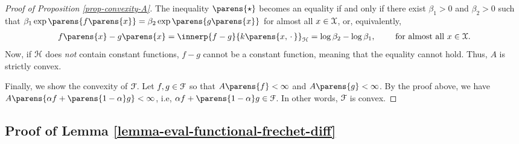 \begin{proof}[Proof of Proposition \ref{prop-convexity-A}]
	The inequality $\parens{\star}$ becomes an equality if and only if there exist $\beta_1 > 0$ and $\beta_2 > 0$ such that $\beta_1 \exp \parens{ f \parens{x} } = \beta_2 \exp \parens{g \parens{x}}$ for almost all $x \in \mathcal{X}$, or, equivalently, 
	\begin{align*}
		f \parens{x} - g \parens{x} = \innerp{f - g}{k \parens{x, \,\cdot\,}}_{\calH} = \log \beta_2 - \log \beta_1, \qquad \text{ for almost all } x \in \calX. 
	\end{align*}
	Now, if $\mathcal{H}$ does \emph{not} contain constant functions, $f - g$ cannot be a constant function, meaning that the equality cannot hold. Thus, $A$ is strictly convex. 
	
	
	Finally, we show the convexity of $\mathcal{F}$. Let $f, g \in \mathcal{F}$ so that $A \parens{f} < \infty$ and $A \parens{g} < \infty$. By the proof above, we have $A \parens{\alpha f + \parens{1 - \alpha} g} < \infty$, i.e, $\alpha f + \parens{1 - \alpha} g \in \calF$. In other words, $\mathcal{F}$ is convex. 
\end{proof}

\subsection{Proof of Lemma \ref{lemma-eval-functional-frechet-diff}}\label{subsection-proof-lemma-eval-functional-frechet-diff}

